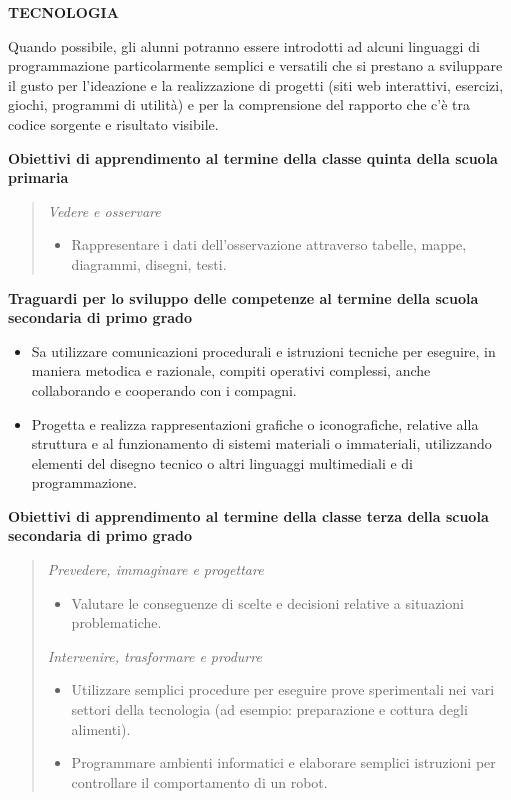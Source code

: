\documentclass[12pt]{report}
\begin{document}
\bigskip
\noindent \textbf{TECNOLOGIA}

Quando possibile, gli alunni potranno essere introdotti ad alcuni linguaggi di programmazione particolarmente semplici e versatili che si prestano a sviluppare il gusto per l’ideazione e la realizzazione di progetti (siti web interattivi, esercizi, giochi, programmi di utilità) e per la comprensione del rapporto che c’è tra codice sorgente e risultato visibile.

\medskip
\noindent \textbf{Obiettivi di apprendimento al termine della classe quinta della scuola primaria}

\begin{quote}
\medskip
\textit{Vedere e osservare}

\begin{itemize}
\item Rappresentare i dati dell’osservazione attraverso tabelle, mappe, diagrammi, disegni, testi.
\end{itemize}
\end{quote}

\medskip
\noindent \textbf{Traguardi per lo sviluppo delle competenze al termine della scuola secondaria di primo grado}

\begin{itemize}
\item Sa utilizzare comunicazioni procedurali e istruzioni tecniche per eseguire, in maniera metodica e razionale, compiti operativi complessi, anche collaborando e cooperando con i compagni.

\item Progetta e realizza rappresentazioni grafiche o iconografiche, relative alla struttura e al funzionamento di sistemi materiali o immateriali, utilizzando elementi del disegno tecnico o altri linguaggi multimediali e di programmazione.
\end{itemize}

\medskip
\noindent \textbf{Obiettivi di apprendimento al termine della classe terza della scuola secondaria di primo grado}

\begin{quote}
\medskip
\textit{Prevedere, immaginare e progettare}

\begin{itemize}
\item Valutare le conseguenze di scelte e decisioni relative a situazioni problematiche.
\end{itemize}

\medskip
\textit{Intervenire, trasformare e produrre}

\begin{itemize}
\item Utilizzare semplici procedure per eseguire prove sperimentali nei vari settori della tecnologia (ad esempio: preparazione e cottura degli alimenti).

\item Programmare ambienti informatici e elaborare semplici istruzioni per controllare il comportamento di un robot.
\end{itemize}
\end{quote}
\end{document}
